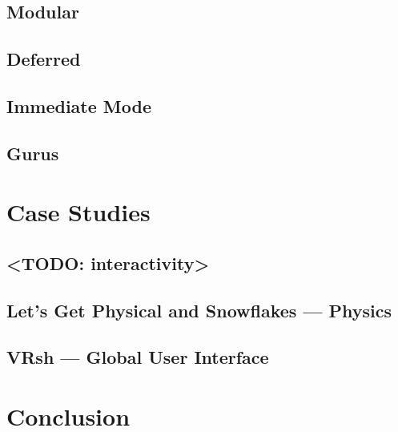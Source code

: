 \documentclass[conference,12pt]{IEEEtran}
\newcommand\name{VRsh}
\begin{document}
\subsection{Modular}

\subsection{Deferred}

\subsection{Immediate Mode}

\subsection{Gurus} %


\section{Case Studies}\label{sec:case-studies}

\subsection{<TODO: interactivity>}

\subsection{Let's Get Physical and Snowflakes --- Physics}

\subsection{{\name} --- Global User Interface}

\section{Conclusion}\label{sec:conclusion}

{\printbibliography}
\end{document}

